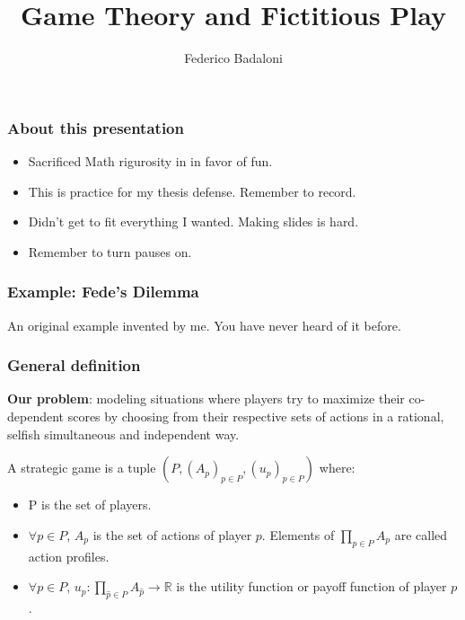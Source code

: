 \documentclass[pdf]{beamer}
\title{Game Theory and Fictitious Play}
\author[]{Federico Badaloni}
\begin{document}
\begin{frame}
    \frametitle{About this presentation}
    \begin{itemize}
        \item Sacrificed Math rigurosity in in favor of fun.
        \item This is practice for my thesis defense. Remember to record.
        \item Didn't get to fit everything I wanted. Making slides is hard.
        \item \pause Remember to turn pauses on.
    \end{itemize}

\end{frame}

\begin{frame}
    \frametitle{Example: Fede's Dilemma}
    An original example invented by me. You have never heard of it before.

\end{frame}

\begin{frame}
    \frametitle{General definition}
    \textbf{Our problem}: modeling situations where players try to maximize their co-dependent scores by choosing from their respective
    sets of actions in a rational, selfish simultaneous and independent way.
    
    \pause
    \begin{definition}
        A strategic game is a tuple $(P, (A_p)_{p \in P}, (u_p)_{p \in P})$ where:
        \begin{itemize}
            \item P is the set of players.
            \item $\forall p \in P$, $A_p$ is the set of actions of player $p$. Elements of $\prod\limits_{p \in P} A_p$ are called action profiles.
            \item $\forall p \in P$, $u_p: \prod\limits_{\widehat{p} \in P} A_{\widehat{p}} \rightarrow \mathbb{R}$ is the utility function or payoff function of player $p$.
        \end{itemize}
    \end{definition}

\end{frame}
\end{document}
